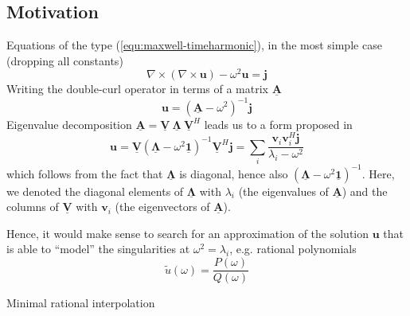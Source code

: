 \documentclass[11pt, a4paper]{article}
\begin{document}
\subsection{Motivation}
\label{subsec:motivation}

Equations of the type (\ref{equ:maxwell-timeharmonic}), in the most simple case (dropping
all constants)
\begin{equation}
    \nabla \times (\nabla \times \mathbf{u}) - \omega^2 \mathbf{u} = \mathbf{j}
\end{equation}
Writing the double-curl operator in terms of a matrix $\mathbf{\underline{A}}$
\begin{equation}
    \mathbf{u} = (\mathbf{\underline{A}} - \omega^2)^{-1} \mathbf{j}
\end{equation}
Eigenvalue decomposition $\mathbf{\underline{A}} = \mathbf{\underline{V}} ~ \boldsymbol{\underline{\Lambda}} ~ \mathbf{\underline{V}}^H$
leads us to a form proposed in \cite{helmholtz-motivation}
\begin{equation}
    \mathbf{u} = \mathbf{\underline{V}} (\boldsymbol{\underline{\Lambda}} - \omega^2 \boldsymbol{\underline{1}})^{-1} \mathbf{\underline{V}}^H \mathbf{j} 
    = \sum_i \frac{\mathbf{v}_i \mathbf{v}_i^H \mathbf{j}}{\lambda_i - \omega^2} \label{equ:motivation}
\end{equation}
which follows from the fact that $\boldsymbol{\underline{\Lambda}}$ is diagonal,
hence also $(\boldsymbol{\underline{\Lambda}} - \omega^2 \boldsymbol{\underline{1}})^{-1}$.
Here, we denoted the diagonal elements of $\boldsymbol{\underline{\Lambda}}$ with 
$\lambda_i$ (the eigenvalues of $\mathbf{\underline{A}}$) and the columns of
$\mathbf{\underline{V}}$ with $\mathbf{v}_i$ (the eigenvectors of $\mathbf{\underline{A}}$).

Hence, it would make sense to search for an approximation of the solution $\mathbf{u}$
that is able to \enquote{model} the singularities at $\omega^2 = \lambda_i$, e.g.
rational polynomials
\begin{equation}
    \tilde{u}(\omega) = \frac{P(\omega)}{Q(\omega)}
\end{equation}

\citep{greedyMRI}

\begin{algorithm}
    \caption{Minimal rational interpolation} \label{alg:MRI}
    
\end{algorithm}
\end{document}
